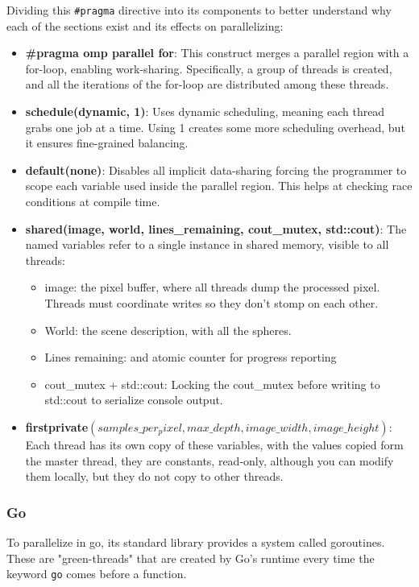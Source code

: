 Dividing this \texttt{\#pragma} directive into its components to better understand why each of the sections exist and its effects on parallelizing:
\begin{itemize}
    \item \textbf{\#pragma omp parallel for}: This construct merges a parallel region with a for-loop, enabling work-sharing. Specifically, a group of threads is created, and all the iterations of the for-loop  are distributed among these threads.
    
    \item \textbf{schedule(dynamic, 1)}: Uses dynamic scheduling, meaning each thread grabs one job at a time. Using 1 creates some more scheduling overhead, but it ensures fine-grained balancing.
    
    \item \textbf{default(none)}: Disables all implicit data-sharing forcing the programmer to scope each variable used inside the parallel region. This helps at checking race conditions at compile time.
    
    \item \textbf{shared(image, world, lines\_remaining, cout\_mutex, std::cout)}: The named variables refer to a single instance in shared memory, visible to all threads:
    \begin{itemize}
        \item image: the pixel buffer, where all threads dump the processed pixel. Threads must coordinate writes so they don't stomp on each other.
        \item World: the scene description, with all the spheres.
        \item Lines remaining: and atomic counter for progress reporting
        \item cout\_mutex + std::cout: Locking the cout\_mutex before writing to std::cout to serialize console output.
    \end{itemize}
    
    \item \textbf{firstprivate$(
    samples\_ per_pixel,
    max\_ depth,
    image\_ width,
    image\_ height)$}:
    Each thread has its own copy of these variables, with the values copied form the master thread, they are constants, read-only, although you can modify them locally, but they do not copy to other threads.
\end{itemize}

\subsubsection{Go}
To parallelize in go, its standard library provides a system called \glspl{goroutine}. These are "\glspl{green-thread}" that are created by Go's runtime every time the keyword \texttt{go} comes before a function.

